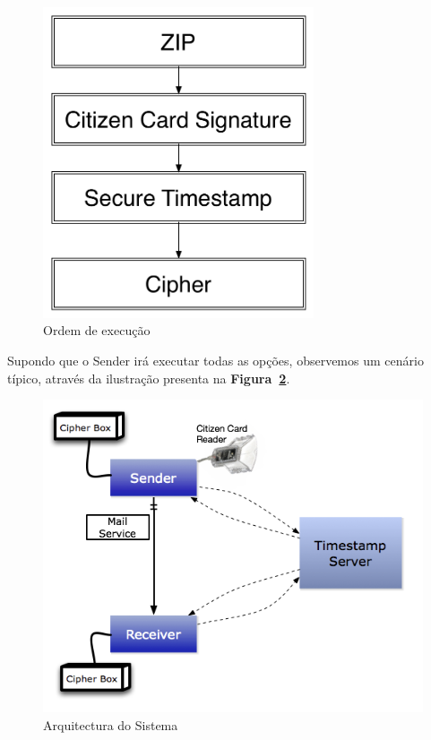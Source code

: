 \begin{figure}[htp]
\centering 
\includegraphics[width=8cm]{./Figures/Architecture.pdf}
\caption{Ordem de execução}
\label{fig:order}
\end{figure}

Supondo que o Sender irá executar todas as opções, observemos um cenário típico, através da ilustração presenta na \textbf{Figura~\ref{fig:chart}}.

\begin{figure}[htp]
\centering 
\includegraphics[width=12cm]{./Figures/chart.png}
\caption{Arquitectura do Sistema}
\label{fig:chart}
\end{figure}

